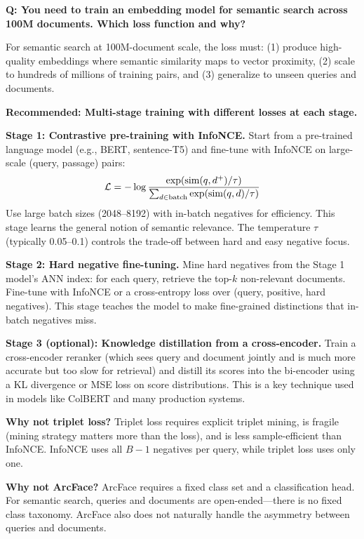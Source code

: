 \begin{interviewq}
\textbf{Q: You need to train an embedding model for semantic search across 100M documents. Which loss function and why?}

 \quad {} \quad \badgefreq{\freqhigh}

\stronganswer For semantic search at 100M-document scale, the loss must: (1) produce high-quality embeddings where semantic similarity maps to vector proximity, (2) scale to hundreds of millions of training pairs, and (3) generalize to unseen queries and documents.

\textbf{Recommended: Multi-stage training with different losses at each stage.}

\textbf{Stage 1: Contrastive pre-training with InfoNCE.} Start from a pre-trained language model (e.g., BERT, sentence-T5) and fine-tune with InfoNCE on large-scale (query, passage) pairs:
$$\mathcal{L} = -\log \frac{\exp(\text{sim}(q, d^+)/\tau)}{\sum_{d \in \text{batch}} \exp(\text{sim}(q, d)/\tau)}$$
Use large batch sizes (2048--8192) with in-batch negatives for efficiency. This stage learns the general notion of semantic relevance. The temperature $\tau$ (typically 0.05--0.1) controls the trade-off between hard and easy negative focus.

\textbf{Stage 2: Hard negative fine-tuning.} Mine hard negatives from the Stage 1 model's ANN index: for each query, retrieve the top-$k$ non-relevant documents. Fine-tune with InfoNCE or a cross-entropy loss over (query, positive, hard negatives). This stage teaches the model to make fine-grained distinctions that in-batch negatives miss.

\textbf{Stage 3 (optional): Knowledge distillation from a cross-encoder.} Train a cross-encoder reranker (which sees query and document jointly and is much more accurate but too slow for retrieval) and distill its scores into the bi-encoder using a KL divergence or MSE loss on score distributions. This is a key technique used in models like ColBERT and many production systems.

\textbf{Why not triplet loss?} Triplet loss requires explicit triplet mining, is fragile (mining strategy matters more than the loss), and is less sample-efficient than InfoNCE. InfoNCE uses all $B-1$ negatives per query, while triplet loss uses only one.

\textbf{Why not ArcFace?} ArcFace requires a fixed class set and a classification head. For semantic search, queries and documents are open-ended---there is no fixed class taxonomy. ArcFace also does not naturally handle the asymmetry between queries and documents.


\end{interviewq}
